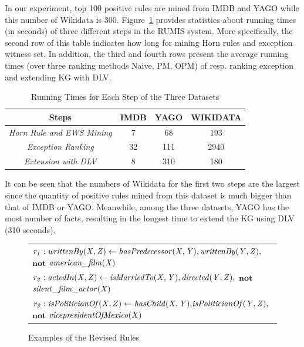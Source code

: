In our experiment, top 100 positive rules are mined from IMDB and YAGO while this number of Wikidata is 300. Figure~\ref{tab:run_time} provides statistics about running times (in seconds) of three different steps in the RUMIS system. More specifically, the second row of this table indicates how long for mining Horn rules and exception witness set. In addition, the third and fourth rows present the average running times (over three ranking methods Naive, PM, OPM) of resp. ranking exception and extending KG with DLV.

\begin{table}[ht]
\centering
\footnotesize{
\begin{tabular}{|c|ccc|}
\hline
\textbf{Steps} & \textbf{IMDB} & \textbf{YAGO} & \textbf{WIKIDATA}\\
\hline
 \textit{Horn Rule and EWS Mining} & 7 & 68 & 193\\
 \textit{Exception Ranking} & 32 & 111 & 2940\\
 \textit{Extension with DLV} & 8 & 310 & 180\\
 \hline 
\end{tabular}
}
\smallskip
\caption{Running Times for Each Step of the Three Datasets}
\label{tab:run_time}
\end{table}

It can be seen that the numbers of Wikidata for the first two steps are the largest since the quantity of positive rules mined from this dataset is much bigger than that of IMDB or YAGO. Meanwhile, among the three datasets, YAGO has the most number of facts, resulting in the longest time to extend the KG using DLV (310 seconds).

\begin{figure}[t]
    \centering
   
    \vspace{-.2cm}
    \begin{tabular}{l}
 {\scriptsize
        $\mathit{r_1: writtenBy(X, Z)}  \leftarrow
        \mathit{hasPredecessor(X, Y)},\mathit{writtenBy(Y, Z)},$ $ \textbf{not}$  $\mathit{american\_film(X)} $}\\        
       {\scriptsize 
$\mathit{r_2:  actedIn(X, Z)}  \leftarrow
        \mathit{isMarriedTo(X, Y)},\mathit{directed(Y, Z)},$ $ \textbf{not}$  $\mathit{silent\_film\_actor(X)} $} \\
          {\scriptsize 
$\mathit{r_3:  isPoliticianOf(X, Z)}  \leftarrow
        \mathit{hasChild(X, Y)}{,}\mathit{isPoliticianOf(Y, Z)}{,}$$ \textbf{not}$  $\mathit{vicepresidentOfMexico(X)} $} \\
 \end{tabular}            
    \caption{Examples of the Revised Rules}
 \label{fig:examplerules}
 \vspace{-.4cm}
\end{figure}

